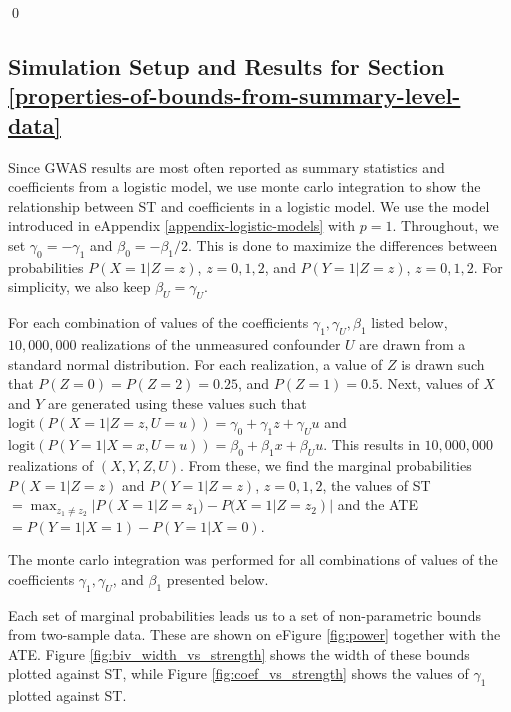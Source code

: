 \documentclass[
]{article}
\theoremstyle{plain}
\begin{document}
\qed

\newpage

\hypertarget{simulation-setup-and-results-for-section}{%
\subsection{\texorpdfstring{Simulation Setup and Results for Section \ref{properties-of-bounds-from-summary-level-data} \label{appendix-sim-results}}{Simulation Setup and Results for Section  }}\label{simulation-setup-and-results-for-section}}

Since GWAS results are most often reported as summary statistics and coefficients from a logistic model, we use monte carlo integration to show the relationship between ST and coefficients in a logistic model. We use the model introduced in eAppendix \ref{appendix-logistic-models} with \(p=1\). Throughout, we set \(\gamma_0 = -\gamma_1\) and \(\beta_0 = -\beta_1/2\). This is done to maximize the differences between probabilities \(P(X = 1 | Z = z)\), \(z=0,1,2\), and \(P(Y = 1 | Z = z)\), \(z=0,1,2\). For simplicity, we also keep \(\beta_U = \gamma_U\).

For each combination of values of the coefficients \(\gamma_1, \gamma_U, \beta_1\) listed below, \(10,000,000\) realizations of the unmeasured confounder \(U\) are drawn from a standard normal distribution. For each realization, a value of \(Z\) is drawn such that \(P(Z = 0) = P(Z = 2) = 0.25\), and \(P(Z = 1) = 0.5\). Next, values of \(X\) and \(Y\) are generated using these values such that \(\text{logit}(P(X = 1 | Z = z, U = u)) = \gamma_0 + \gamma_1 z + \gamma_U u\) and \(\text{logit}(P(Y = 1 | X = x, U = u)) = \beta_0 + \beta_1 x + \beta_U u\). This results in \(10,000,000\) realizations of \((X,Y,Z,U)\). From these, we find the marginal probabilities \(P(X = 1 | Z = z)\) and \(P(Y = 1 | Z = z)\), \(z = 0,1,2\), the values of ST \(=\max_{z_1 \neq z_2} |P(X = 1 | Z = z_1) - P(X = 1 | Z = z_2)|\) and the ATE \(= P(Y = 1 | X = 1) - P(Y = 1 | X = 0)\).

\begin{table}[H]
  \centering
  \caption{The monte carlo integration was performed for all combinations of values of the coefficients $\gamma_1, \gamma_U$, and $\beta_1$ presented below.}
  \label{tab:sim_coefficients}
  
\end{table}

Each set of marginal probabilities leads us to a set of non-parametric bounds from two-sample data. These are shown on eFigure \ref{fig:power} together with the ATE. Figure \ref{fig:biv_width_vs_strength} shows the width of these bounds plotted against ST, while Figure \ref{fig:coef_vs_strength} shows the values of \(\gamma_1\) plotted against ST.
\end{document}
